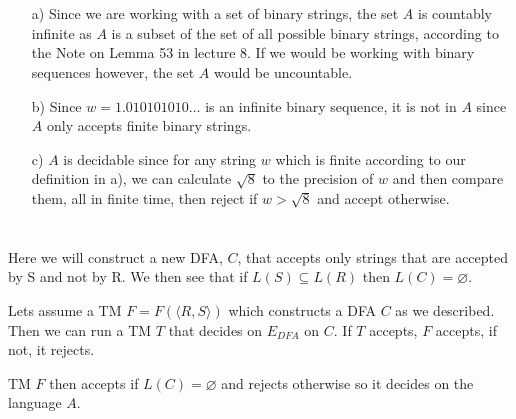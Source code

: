 \documentclass{article}
\begin{document}
	\section{}
	\begin{itemize}
		\item[a)] Since we are working with a set of binary strings, the 
			set $A$ is countably infinite as $A$ is a subset of the set 
			of all possible binary strings, according to the Note on 
			Lemma 53 in lecture 8. If we would be working with binary 
			sequences however, the set $A$ would be uncountable.
		\item[b)] Since $w = 1.010101010\dots$ is an infinite binary 
			sequence, it is not in $A$ since $A$ only accepts finite binary 
			strings.
		\item[c)] $A$ is decidable since for any string $w$ which is 
			finite according to our definition in a), we can calculate 
			$\sqrt{8}$ to the precision of $w$ and then compare them, 
			all in finite time, then reject if $w>\sqrt{8}$ and accept 
			otherwise.
	\end{itemize}

	\section{}
    Here we will construct a new DFA, $C$, that accepts only strings that are 
	accepted by S and not by R. We then see that if $L(S)\subseteq L(R)$ 
	then $L(C) = \varnothing$. 

	Lets assume a TM $F = F(\langle R,S\rangle)$ which constructs a DFA $C$ 
	as we described. Then we can run a TM $T$ that decides on $E_{DFA}$ on 
	$C$. If $T$ accepts, $F$ accepts, if not, it rejects.

	TM $F$ then accepts if $L(C) = \varnothing$ and rejects otherwise so it 
	decides on the language $A$.
\end{document}
